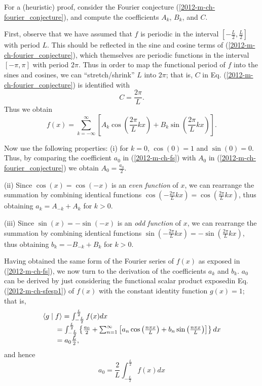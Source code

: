 {\color{OliveGreen}
\bproof

For a (heuristic) proof, consider the Fourier conjecture (\ref{2012-m-ch-fourier_conjecture}),
and compute the coefficients $A_k$, $B_k$, and $C$.

First, observe that we have assumed that $f$ is periodic in the interval $[-\frac{L}{2},\frac{L}{2}]$ with period $L$.
This should be reflected in the sine and cosine terms of   (\ref{2012-m-ch-fourier_conjecture}),
which themselves are periodic functions  in the interval $[- \pi , \pi ]$ with period $2\pi$.
Thus in order to map the functional period of $f$ into the sines and cosines, we can ``stretch/shrink''
$L$ into $2\pi$; that is,
$C$ in Eq.  (\ref{2012-m-ch-fourier_conjecture}) is identified with
\begin{equation}
C=\frac{2\pi}{L}.
\label{2012-m-ch-pfc1}
\end{equation}
Thus we obtain
\begin{equation}
f(x)= \sum_{k=-\infty}^\infty
\left[ A_k \cos (\frac{2\pi}{L} k x) + B_k \sin (\frac{2\pi}{L} k x)\right].
\label{2012-m-ch-pfc2}
\end{equation}

Now use the following properties:
(i)
for $k=0$, $\cos (0)=1$ and $\sin (0)=0$.
Thus, by comparing the coefficient $a_0$ in
(\ref{2012-m-ch-fs}) with $A_0$ in (\ref{2012-m-ch-fourier_conjecture})
we obtain  $A_0=\frac{a_0}{2}$.

(ii) Since $\cos (x)= \cos (-x)$ is an {\em even function} of $x$, we can rearrange the summation
by combining identical functions  $\cos (-\frac{2\pi}{L} k x) = \cos (\frac{2\pi}{L} k x) $,
thus obtaining $a_k = A_{-k}+A_k$ for $k>0$.

(iii) Since $\sin (x)= -\sin (-x)$ is an {\em odd function} of $x$, we can rearrange the summation
by combining identical functions  $\sin (-\frac{2\pi}{L} k x) =  -\sin (\frac{2\pi}{L} k x)$,
thus obtaining $b_k = -B_{-k}+B_k$ for $k>0$.

Having obtained the same form of the Fourier series of $f(x)$ as exposed in (\ref{2012-m-ch-fs}),
we now turn to the derivation of the coefficients $a_k$ and $b_k$.
$a_0$ can be derived by just considering the functional scalar product exposedin
Eq. (\ref{2012-m-ch-sfesp1})
of $f(x)$ with the constant identity function $g(x)=1$; that is,
\begin{equation}
\begin{array}{l}
\langle   g  \mid f \rangle
=
\int_{-\frac{L}{2}}^\frac{L}{2} f(x)  dx \\
\qquad =
\int_{-\frac{L}{2}}^\frac{L}{2} \left\{ {a_0\over 2}+\sum_{n=1}^\infty
\left[a_n\cos\left(\frac{n\pi x}{L}\right)+b_n\sin\left(\frac{n\pi x}{L}\right)\right]\right\}  dx \\
\qquad =
a_0\frac{L}{2}
,
\end{array}
\label{2012-m-ch-sfespnn}
\end{equation}
and hence
\begin{equation}
a_0 = \frac{2}{L} \int_{-\frac{L}{2}}^\frac{L}{2} f(x)  dx
\label{2012-m-ch-sfespnn2}
\end{equation}

}
